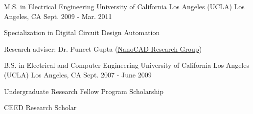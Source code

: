 \documentclass[12pt, letterpaper]{awesome-cv}
\begin{document}

\begin{cventries}
\cventry
		{M.S. in Electrical Engineering}  %
		{University of California Los Angeles (UCLA)} %
		{Los Angeles, CA} %
		{Sept. 2009 - Mar. 2011} %
		{%
			\begin{cvitems}
				\item {Specialization in Digital Circuit Design Automation}
				\item {Research adviser: Dr. Puneet Gupta ({\href{https://nanocad.ee.ucla.edu}{NanoCAD Research Group}})}
			\end{cvitems}
		} 

	\cventry
		{B.S. in Electrical and Computer Engineering}  %
		{University of California Los Angeles (UCLA)} %
		{Los Angeles, CA} %
		{Sept. 2007 - June 2009} %
		{ %
			\begin{cvitems}
				\item {Undergraduate Research Fellow Program Scholarship}
				\item {CEED Research Scholar}
			\end{cvitems}
		} 

\end{cventries}

\end{document}
